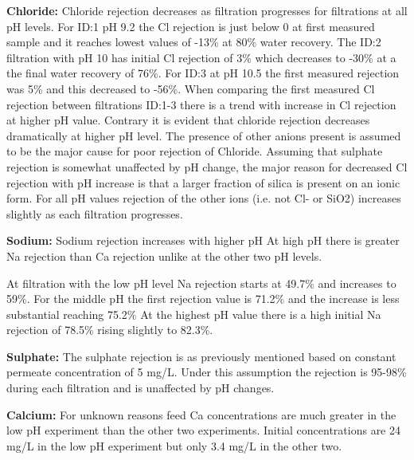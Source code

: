 \textbf{Chloride:}
Chloride rejection decreases as filtration progresses for filtrations at all pH levels.
For ID:1 pH 9.2 the Cl rejection is just below 0 at first measured sample and it reaches lowest values of -13\% at 80\% water recovery.
The ID:2 filtration with pH 10 has initial Cl rejection of 3\%  which decreases to -30\% at a the final water recovery of 76\%.
For ID:3 at pH 10.5 the first measured rejection was 5\% and this decreased to -56\%.
When comparing the first measured Cl rejection between filtrations ID:1-3 there is a trend with increase in Cl rejection at higher pH value. 
Contrary it is evident that chloride rejection decreases dramatically at higher pH level. 
The presence of other anions present is assumed to be the major cause for poor rejection of Chloride.
Assuming that sulphate rejection is somewhat unaffected by pH change, the major reason for decreased Cl rejection with pH increase is that a larger fraction of silica is present on an ionic form.
For all pH values rejection of the other ions (i.e. not Cl- or SiO2) increases slightly as each filtration progresses.

\textbf{Sodium:}
Sodium rejection increases with higher pH
At high pH there is greater Na rejection than Ca rejection unlike at the other two pH levels.

At filtration with the low pH level Na rejection starts at 49.7\% and increases to 59\%.
For the middle pH the first rejection value is 71.2\% and the increase is less substantial reaching 75.2\%
At the highest pH value there is a high initial Na rejection of 78.5\% rising slightly to 82.3\%.



\textbf{Sulphate:}
The sulphate rejection is as previously mentioned based on constant permeate concentration of 5 mg/L.
Under this assumption the rejection is 95-98\% during each filtration and is unaffected by pH changes.



\textbf{Calcium: }
For unknown reasons feed Ca concentrations are much greater in the low pH experiment than the other two experiments.
Initial concentrations are 24 mg/L in the low pH experiment but only 3.4 mg/L in the other two.


